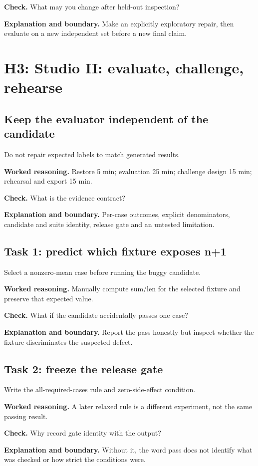 \textbf{Check.} What may you change after held-out inspection?

\textbf{Explanation and boundary.} Make an explicitly exploratory repair, then evaluate on a new independent set before a new final claim.

\section{H3: Studio II: evaluate, challenge, rehearse}
\subsection{Keep the evaluator independent of the candidate}
Do not repair expected labels to match generated results.

\textbf{Worked reasoning.} Restore 5 min; evaluation 25 min; challenge design 15 min; rehearsal and export 15 min.

\textbf{Check.} What is the evidence contract?

\textbf{Explanation and boundary.} Per-case outcomes, explicit denominators, candidate and suite identity, release gate and an untested limitation.

\subsection{Task 1: predict which fixture exposes n+1}
Select a nonzero-mean case before running the buggy candidate.

\textbf{Worked reasoning.} Manually compute sum/len for the selected fixture and preserve that expected value.

\textbf{Check.} What if the candidate accidentally passes one case?

\textbf{Explanation and boundary.} Report the pass honestly but inspect whether the fixture discriminates the suspected defect.

\subsection{Task 2: freeze the release gate}
Write the all-required-cases rule and zero-side-effect condition.

\textbf{Worked reasoning.} A later relaxed rule is a different experiment, not the same passing result.

\textbf{Check.} Why record gate identity with the output?

\textbf{Explanation and boundary.} Without it, the word pass does not identify what was checked or how strict the conditions were.

